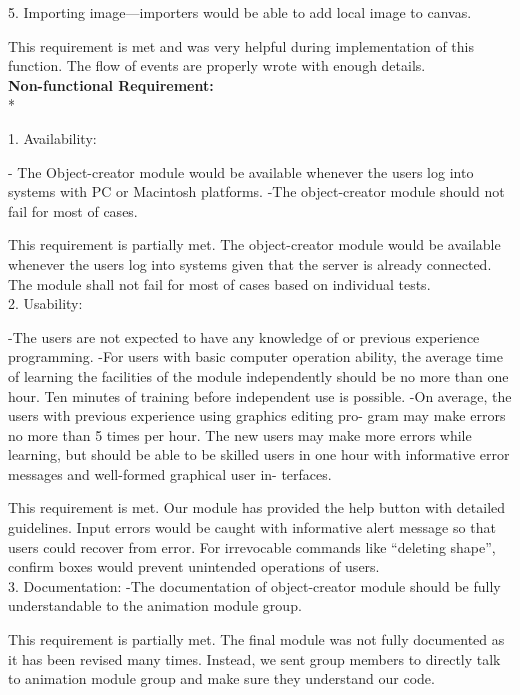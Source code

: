 \documentclass[a4paper, 11pt]{article} %
\begin{document}
5.	Importing image—importers would be able to add local image to canvas.

This requirement is met and was very helpful during implementation of this function. The flow of events are properly wrote with enough details.
\\

\textbf {Non-functional Requirement:} \\*

1. 	Availability:

- The Object-creator module would be available whenever the users log into systems with PC or Macintosh platforms.
-The object-creator module should not fail for most of cases.

This requirement is partially met. The object-creator module would be available whenever the users log into systems given that the server is already connected. The module shall not fail for most of cases based on individual tests.\\

2.	Usability:

-The users are not expected to have any knowledge of or previous experience programming.
-For users with basic computer operation ability, the average time of learning the facilities of the module independently should be no more than one hour.
Ten minutes of training before independent use is possible.
-On average, the users with previous experience using graphics editing pro-
gram may make errors no more than 5 times per hour. The new users may
make more errors while learning, but should be able to be skilled users in
one hour with informative error messages and well-formed graphical user in-
terfaces.

This requirement is met. Our module has provided the help button with detailed guidelines. Input errors would be caught with informative alert message so that users could recover from error. For irrevocable commands like “deleting shape”, confirm boxes would prevent unintended operations of users.\\

3. 	Documentation:
-The documentation of object-creator module should be fully understandable to the animation module group.

This requirement is partially met. The final module was not fully documented as it has been revised many times. Instead, we sent group members to directly talk to animation module group and make sure they understand our code.\\
\end{document}
